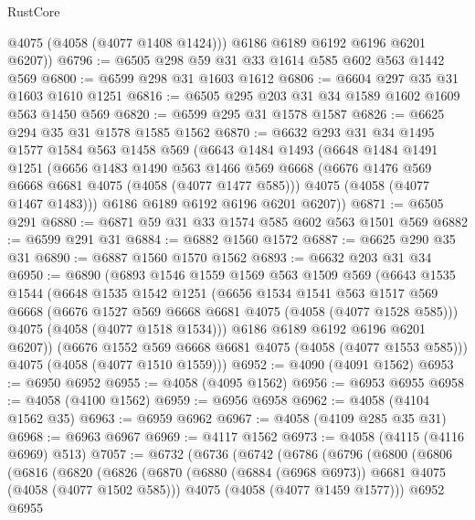 \begin{lexlean}{RustCore}
\begin{coremodule}
          @4075
          (@4058 (@4077 @1408 @1424)))
        @6186
        @6189
        @6192
        @6196
        @6201
        @6207))
@6796 := @6505 @298 @59 @31 @33 @1614 @585 @602 @563 @1442 @569
@6800 := @6599 @298 @31 @1603 @1612
@6806 := @6604 @297 @35 @31 @1603 @1610 @1251
@6816 := @6505 @295 @203 @31 @34 @1589 @1602 @1609 @563 @1450 @569
@6820 := @6599 @295 @31 @1578 @1587
@6826 := @6625 @294 @35 @31 @1578 @1585 @1562
@6870 := @6632
    @293
    @31
    @34
    @1495
    @1577
    @1584
    @563
    @1458
    @569
    (@6643
      @1484
      @1493
      (@6648
        @1484
        @1491
        @1251
        (@6656
          @1483
          @1490
          @563
          @1466
          @569
          @6668
          (@6676 @1476 @569 @6668 @6681 @4075 (@4058 (@4077 @1477 @585)))
          @4075
          (@4058 (@4077 @1467 @1483)))
        @6186
        @6189
        @6192
        @6196
        @6201
        @6207))
@6871 := @6505 @291
@6880 := @6871 @59 @31 @33 @1574 @585 @602 @563 @1501 @569
@6882 := @6599 @291 @31
@6884 := @6882 @1560 @1572
@6887 := @6625 @290 @35 @31
@6890 := @6887 @1560 @1570 @1562
@6893 := @6632 @203 @31 @34
@6950 := @6890
    (@6893
      @1546
      @1559
      @1569
      @563
      @1509
      @569
      (@6643
        @1535
        @1544
        (@6648
          @1535
          @1542
          @1251
          (@6656
            @1534
            @1541
            @563
            @1517
            @569
            @6668
            (@6676 @1527 @569 @6668 @6681 @4075 (@4058 (@4077 @1528 @585)))
            @4075
            (@4058 (@4077 @1518 @1534)))
          @6186
          @6189
          @6192
          @6196
          @6201
          @6207))
      (@6676 @1552 @569 @6668 @6681 @4075 (@4058 (@4077 @1553 @585)))
      @4075
      (@4058 (@4077 @1510 @1559)))
@6952 := @4090 (@4091 @1562)
@6953 := @6950 @6952
@6955 := @4058 (@4095 @1562)
@6956 := @6953 @6955
@6958 := @4058 (@4100 @1562)
@6959 := @6956 @6958
@6962 := @4058 (@4104 @1562 @35)
@6963 := @6959 @6962
@6967 := @4058 (@4109 @285 @35 @31)
@6968 := @6963 @6967
@6969 := @4117 @1562
@6973 := @4058 (@4115 (@4116 @6969) @513)
@7057 := @6732
    (@6736
      (@6742
        (@6786
          (@6796
            (@6800
              (@6806
                (@6816
                  (@6820
                    (@6826
                      (@6870
                        (@6880 (@6884 (@6968 @6973)) @6681 @4075 (@4058 (@4077 @1502 @585)))
                        @4075
                        (@4058 (@4077 @1459 @1577)))
                      @6952
                      @6955

\end{coremodule}
\end{lexlean}
